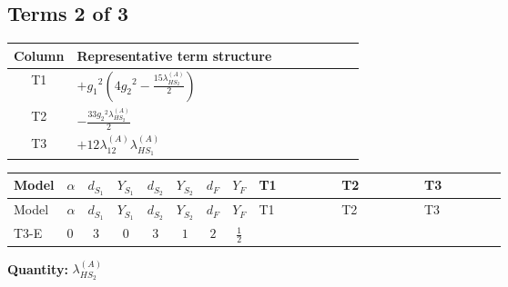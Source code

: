 \documentclass[8pt]{article}
\begin{document}
\begin{landscape}
\subsection*{Terms 2 of 3}
\begin{center}
\begin{tabular}{@{}c >{\raggedright\arraybackslash}p{0.82\linewidth}@{}}
\toprule
Column & Representative term structure \\
\midrule
T1 & \(\displaystyle +{g_1}^2 \left(4 {g_2}^2-\frac{15 {\lambda_{HS_2}^{(A)}}}{2}\right)\) \\
\midrule
T2 & \(\displaystyle -\frac{33 {g_2}^2 {\lambda_{HS_2}^{(A)}}}{2}\) \\
\midrule
T3 & \(\displaystyle +12 {\lambda_{12}^{(A)}} {\lambda_{HS_1}^{(A)}}\) \\
\midrule
\bottomrule
\end{tabular}
\end{center}
\smallskip
\tiny
\begin{longtable}{@{}llcccccc >{\raggedright\arraybackslash}p{0.21\linewidth} >{\raggedright\arraybackslash}p{0.21\linewidth} >{\raggedright\arraybackslash}p{0.21\linewidth}@{}}
\toprule
Model & $\alpha$ & $d_{S_1}$ & $Y_{S_1}$ & $d_{S_2}$ & $Y_{S_2}$ & $d_F$ & $Y_F$ & T1 & T2 & T3 \\
\midrule
\endfirsthead
\toprule
Model & $\alpha$ & $d_{S_1}$ & $Y_{S_1}$ & $d_{S_2}$ & $Y_{S_2}$ & $d_F$ & $Y_F$ & T1 & T2 & T3 \\
\midrule
\endhead
T3-E & $0$ & $3$ & $0$ & $3$ & $1$ & $2$ & $\frac{1}{2}$ & \scriptsize\adjustbox{max width=\linewidth}{$\begin{gathered} +{g_1}^2 \left(4 {g_2}^2-\frac{15 {\lambda_{HS_2}^{(A)}}}{2}\right)\end{gathered}$} & \scriptsize\adjustbox{max width=\linewidth}{$\begin{gathered} -\frac{33 {g_2}^2 {\lambda_{HS_2}^{(A)}}}{2}\end{gathered}$} & \scriptsize\adjustbox{max width=\linewidth}{$\begin{gathered} +12 {\lambda_{12}^{(A)}} {\lambda_{HS_1}^{(A)}}\end{gathered}$} \\
\midrule
\bottomrule
\end{longtable}
\clearpage
\noindent\textbf{Quantity: }$\lambda_{HS_2}^{(A)}$\par\smallskip

\end{landscape}
\end{document}
